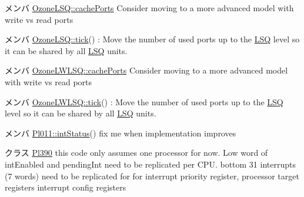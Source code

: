 \label{todo__todo000045}
\hypertarget{todo__todo000045}{}
 
\begin{DoxyDescription}
\item[メンバ \hyperlink{classOzoneLSQ_ab2e23636971c40e7ed945026b2a184e1}{OzoneLSQ::cachePorts} ]Consider moving to a more advanced model with write vs read ports 
\end{DoxyDescription}

\label{todo__todo000044}
\hypertarget{todo__todo000044}{}
 
\begin{DoxyDescription}
\item[メンバ \hyperlink{classOzoneLSQ_a873dd91783f9efb4a590aded1f70d6b0}{OzoneLSQ::tick}() ]: Move the number of used ports up to the \hyperlink{classLSQ}{LSQ} level so it can be shared by all \hyperlink{classLSQ}{LSQ} units. 
\end{DoxyDescription}

\label{todo__todo000047}
\hypertarget{todo__todo000047}{}
 
\begin{DoxyDescription}
\item[メンバ \hyperlink{classOzoneLWLSQ_ab2e23636971c40e7ed945026b2a184e1}{OzoneLWLSQ::cachePorts} ]Consider moving to a more advanced model with write vs read ports 
\end{DoxyDescription}

\label{todo__todo000046}
\hypertarget{todo__todo000046}{}
 
\begin{DoxyDescription}
\item[メンバ \hyperlink{classOzoneLWLSQ_a873dd91783f9efb4a590aded1f70d6b0}{OzoneLWLSQ::tick}() ]: Move the number of used ports up to the \hyperlink{classLSQ}{LSQ} level so it can be shared by all \hyperlink{classLSQ}{LSQ} units. 
\end{DoxyDescription}

\label{todo__todo000056}
\hypertarget{todo__todo000056}{}
 
\begin{DoxyDescription}
\item[メンバ \hyperlink{classPl011_a57f9c26cb4108beccb35bb1938990932}{Pl011::intStatus}() ]fix me when implementation improves 
\end{DoxyDescription}

\label{todo__todo000054}
\hypertarget{todo__todo000054}{}
 
\begin{DoxyDescription}
\item[クラス \hyperlink{classPl390}{Pl390} ]this code only assumes one processor for now. Low word of intEnabled and pendingInt need to be replicated per CPU. bottom 31 interrupts (7 words) need to be replicated for for interrupt priority register, processor target registers interrupt config registers 
\end{DoxyDescription}

